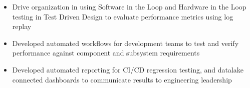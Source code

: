 \begin{itemize} [leftmargin = \itemmargin]
	\item Drive organization in using Software in the Loop and Hardware in the Loop testing in Test Driven Design to evaluate performance metrics using log replay
	\item Developed automated workflows for development teams to test and verify performance against component and subsystem requirements
	\item Developed automated reporting for CI/CD regression testing, and datalake connected dashboards to communicate results to engineering leadership 
	
\end{itemize} \\